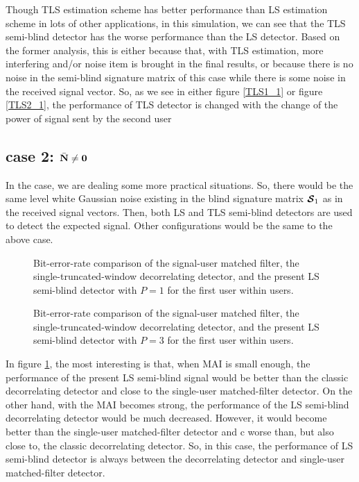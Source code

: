 \documentclass[a4paper,11pt,fleqn]{article}
\newcommand{\bN}{{\bf N}}
\newcommand{\bcS}{{\mbox {\boldmath ${\cal S}$}}}
\begin{document}
Though TLS estimation scheme has better performance than LS
estimation scheme in lots of other applications, in this
simulation, we can see that the TLS semi-blind detector has the
worse performance than the LS detector. Based on the former
analysis, this is either because that, with TLS estimation, more
interfering and/or noise item is brought in the final results, or
because there is no noise in the semi-blind signature matrix of
this case while there is some noise in the received signal vector.
So, as we see in either figure \ref{TLS1_1} or figure
\ref{TLS2_1}, the performance of TLS detector is changed with the
change of the power of signal sent by the second user


\subsection*{case 2: $\bar{\bN} \neq \mathbf{0}$}

In the case, we are dealing some more practical situations. So,
there would be the same level white Gaussian noise existing in the
blind signature matrix $\bcS_1$ as in the received signal vectors.
Then, both LS and TLS semi-blind detectors are used to detect the
expected signal. Other configurations would be the same to the
above case.

\begin{figure}
\caption{Bit-error-rate comparison of the signal-user matched
filter, the single-truncated-window decorrelating detector, and
the present LS semi-blind detector with $P=1$ for the first user
within users.} \label{LS1_2}
\end{figure}

\begin{figure}
\caption{Bit-error-rate comparison of the signal-user matched
filter, the single-truncated-window decorrelating detector, and
the present LS semi-blind detector with $P=3$ for the first user
within users.} \label{LS2_2}
\end{figure}

In figure \ref{LS1_2}, the most interesting is that, when MAI is
small enough, the performance of the present LS semi-blind signal
would be better than the classic decorrelating detector and close
to the single-user matched-filter detector. On the other hand,
with the MAI becomes strong, the performance of the LS semi-blind
decorrelating detector would be much decreased. However, it would
become better than the single-user matched-filter detector and c
worse than, but also close to, the classic decorrelating detector.
So, in this case, the performance of LS semi-blind detector is
always between the decorrelating detector and single-user
matched-filter detector.
\end{document}
